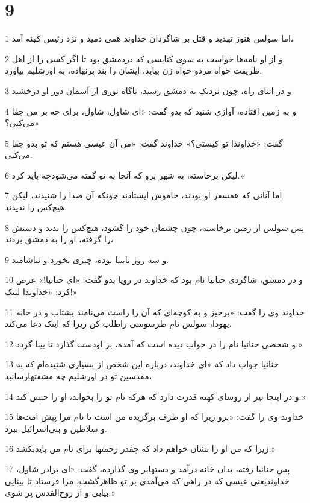 \chapter{9}

\par 1 اما سولس هنوز تهدید و قتل بر شاگردان خداوند همی دمید و نزد رئیس کهنه آمد،
\par 2 و از او نامه‌ها خواست به سوی کنایسی که دردمشق بود تا اگر کسی را از اهل طریقت خواه مردو خواه زن بیابد، ایشان را بند برنهاده، به اورشلیم بیاورد.
\par 3 و در اثنای راه، چون نزدیک به دمشق رسید، ناگاه نوری از آسمان دور او درخشید
\par 4 و به زمین افتاده، آوازی شنید که بدو گفت: «ای شاول، شاول، برای چه بر من جفا می‌کنی؟»
\par 5 گفت: «خداوندا تو کیستی؟» خداوند گفت: «من آن عیسی هستم که تو بدو جفا می‌کنی.
\par 6 لیکن برخاسته، به شهر برو که آنجا به تو گفته می‌شودچه باید کرد.»
\par 7 اما آنانی که همسفر او بودند، خاموش ایستادند چونکه آن صدا را شنیدند، لیکن هیچ‌کس را ندیدند.
\par 8 پس سولس از زمین برخاسته، چون چشمان خود را گشود، هیچ‌کس را ندید و دستش را گرفته، او را به دمشق بردند،
\par 9 و سه روز نابینا بوده، چیزی نخورد و نیاشامید.
\par 10 و در دمشق، شاگردی حنانیا نام بود که خداوند در رویا بدو گفت: «ای حنانیا!» عرض کرد: «خداوندا لبیک!»
\par 11 خداوند وی را گفت: «برخیز و به کوچه‌ای که آن را راست می‌نامند بشتاب و در خانه یهودا، سولس نام طرسوسی راطلب کن زیرا که اینک دعا می‌کند،
\par 12 و شخصی حنانیا نام را در خواب دیده است که آمده، بر اودست گذارد تا بینا گردد.»
\par 13 حنانیا جواب داد که «ای خداوند، درباره این شخص از بسیاری شنیده‌ام که به مقدسین تو در اورشلیم چه مشقتهارسانید،
\par 14 و در اینجا نیز از روسای کهنه قدرت دارد که هر‌که نام تو را بخواند، او را حبس کند.»
\par 15 خداوند وی را گفت: «برو زیرا که او ظرف برگزیده من است تا نام مرا پیش امت‌ها و سلاطین و بنی‌اسرائیل ببرد.
\par 16 زیرا که من او را نشان خواهم داد که چقدر زحمتها برای نام من بایدبکشد.»
\par 17 پس حنانیا رفته، بدان خانه درآمد و دستهابر وی گذارده، گفت: «ای برادر شاول، خداوندیعنی عیسی که در راهی که می‌آمدی بر تو ظاهرگشت، مرا فرستاد تا بینایی بیابی و از روح‌القدس پر شوی.»
